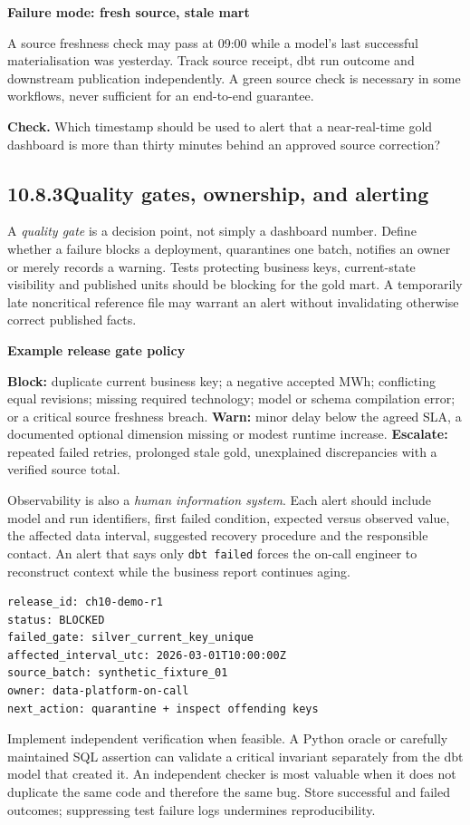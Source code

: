 \documentclass[11pt,twoside]{article}
\newcommand{\topic}[2]{\subsection*{#1\quad #2}}
\begin{document}
\begin{insight}\textbf{Failure mode: fresh source, stale mart}\par
A source freshness check may pass at 09:00 while a model's last successful materialisation was yesterday. Track source receipt, dbt run outcome and downstream publication independently. A green source check is necessary in some workflows, never sufficient for an end-to-end guarantee.\end{insight}
\textbf{Check.} Which timestamp should be used to alert that a near-real-time gold dashboard is more than thirty minutes behind an approved source correction?
\newpage
\topic{10.8.3}{Quality gates, ownership, and alerting}
A \emph{quality gate} is a decision point, not simply a dashboard number. Define whether a failure blocks a deployment, quarantines one batch, notifies an owner or merely records a warning. Tests protecting business keys, current-state visibility and published units should be blocking for the gold mart. A temporarily late noncritical reference file may warrant an alert without invalidating otherwise correct published facts.
\begin{whitebox}\textbf{Example release gate policy}\par
\textbf{Block:} duplicate current business key; a negative accepted MWh; conflicting equal revisions; missing required technology; model or schema compilation error; or a critical source freshness breach. \textbf{Warn:} minor delay below the agreed SLA, a documented optional dimension missing or modest runtime increase. \textbf{Escalate:} repeated failed retries, prolonged stale gold, unexplained discrepancies with a verified source total.\end{whitebox}
Observability is also a \emph{human information system}. Each alert should include model and run identifiers, first failed condition, expected versus observed value, the affected data interval, suggested recovery procedure and the responsible contact. An alert that says only \texttt{dbt failed} forces the on-call engineer to reconstruct context while the business report continues aging.
\begin{lstlisting}[caption={Incident record fields for the release runbook.}]
release_id: ch10-demo-r1
status: BLOCKED
failed_gate: silver_current_key_unique
affected_interval_utc: 2026-03-01T10:00:00Z
source_batch: synthetic_fixture_01
owner: data-platform-on-call
next_action: quarantine + inspect offending keys
\end{lstlisting}
Implement independent verification when feasible. A Python oracle or carefully maintained SQL assertion can validate a critical invariant separately from the dbt model that created it. An independent checker is most valuable when it does not duplicate the same code and therefore the same bug. Store successful and failed outcomes; suppressing test failure logs undermines reproducibility.
\end{document}
